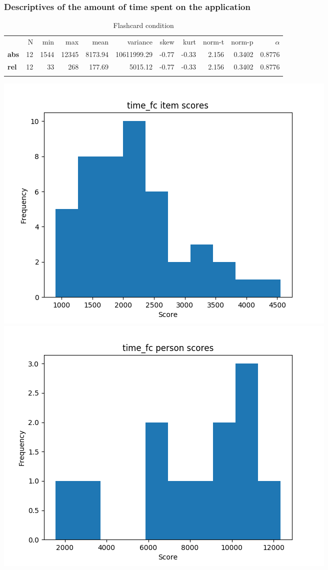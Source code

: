 \subsubsection{Descriptives of the amount of time spent on the application}

\begin{longtable}[c]{@{}lrrrrrrrrrr@{}}
\caption{Flashcard condition}
\endfirsthead
\toprule\addlinespace
& N & min & max & mean & variance & skew & kurt & norm-t &
norm-p & $\alpha$
\\\addlinespace
\midrule
\textbf{abs} & 12 & 1544 & 12345 & 8173.94 & 10611999.29 & -0.77 & -0.33
& 2.156 & 0.3402 & 0.8776
\\\addlinespace
\textbf{rel} & 12 & 33 & 268 & 177.69 & 5015.12 & -0.77 & -0.33 & 2.156
& 0.3402 & 0.8776
\\\addlinespace
\bottomrule
\end{longtable}

\includegraphics{img/time_fc_diff.png} \includegraphics{img/time_fc_abil.png}

